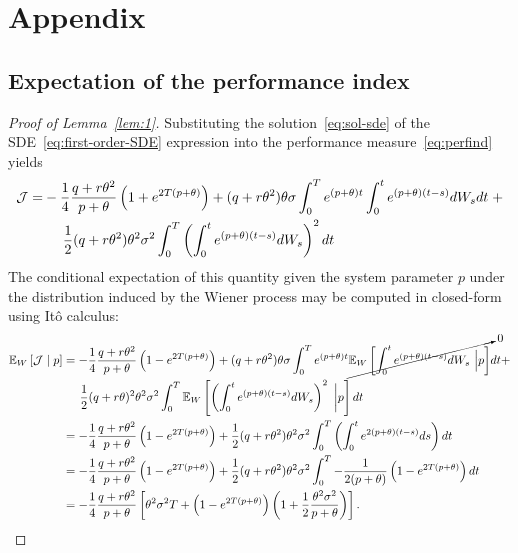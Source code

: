 \chapter*{Appendix}
\appendix
\label{ch:appendix}

\section*{Expectation of the performance index}
\label{sec:app_expectation}

\begin{proof}[Proof of Lemma~\ref{lem:1}]
%
Substituting the solution~\eqref{eq:sol-sde} of the
SDE~\eqref{eq:first-order-SDE} expression into the performance
measure~\eqref{eq:perfind} yields
%
\begin{align*} \mathcal{J} =
        & -\frac{1}{4}\frac{q+r\theta^2}{p+\theta}\left(1 +
        e^{2T(p+\theta)}\right) + 
        (q+r\theta^2)\theta\sigma \int_0^T
        e^{(p+\theta)t} \int_0^t e^{(p+\theta)(t-s)}dW_s
        dt \; + \\ & \hspace{0.5cm}\frac{1}{2}(q+r\theta^2)\theta^2
        \sigma^2 \int_0^T \left( \int_0^t
        e^{(p+\theta)(t-s)} dW_s  \right)^2 dt 
\end{align*}
%
The conditional expectation of this quantity given the system parameter $p$
under the distribution induced by the Wiener process may be computed in
closed-form using It\^{o} calculus:
%
\begin{align*} 
\mathbb{E}_W\left[\mathcal{J} \mid p \right]
        &= -\frac{1}{4}\frac{q+r\theta^2}{p+\theta}\left(1 -
        e^{2T(p+\theta)}\right) +
        (q+r\theta^2)\theta\sigma\int_0^Te^{(p+\theta)t}\cancelto{0}{\mathbb{E}_W\left[\int_0^t
        e^{(p+\theta)(t-s)} dW_s~\Big\rvert p\right]} dt + \\
        & \hspace{0.5cm} \frac{1}{2}(q+r\theta)^2\theta^2\sigma^2\int_0^T\mathbb{E}_W\left[\left(\int_0^t
        e^{(p+\theta)(t-s)} dW_s \right)^2~\bigg\rvert p\right] dt \\
        &=-\frac{1}{4}\frac{q+r\theta^2}{p+\theta}\left(1 -
        e^{2T(p+\theta)}\right) + 
        \frac{1}{2}(q+r\theta^2)\theta^2\sigma^2\int_0^T\left(\int_0^t
        e^{2(p+\theta)(t-s)} ds \right) dt \\ 
        &=-\frac{1}{4}\frac{q+r\theta^2}{p+\theta}\left(1 - e^{2T(p+\theta)}\right) + 
        \frac{1}{2}(q+r\theta^2)\theta^2\sigma^2\int_0^T
        -\frac{1}{2(p+\theta)}\left(1 - e^{2T(p+\theta)}\right) dt \\ 
        &=-\frac{1}{4}\frac{q+r\theta^2}{p+\theta} \left[ \theta^2 \sigma^2 T +
        \left(1 - e^{2T(p+\theta)}\right) \left(1 +
        \frac{1}{2}\frac{\theta^2\sigma^2}{p+\theta}\right)\right].  
\end{align*}
%
\end{proof}

